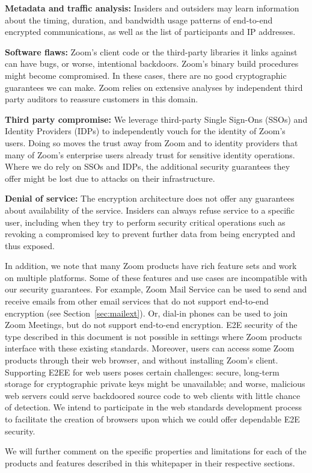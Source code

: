 \begin{description}
	\item {\bf Metadata and traffic analysis:} Insiders and outsiders may learn information about
		the timing, duration, and bandwidth usage patterns of end-to-end encrypted communications,
		as well as the list of participants and IP addresses.
	\item {\bf Software flaws:} Zoom's client code or the third-party libraries it links against can
		have bugs, or worse, intentional backdoors. Zoom's binary build procedures might become
		compromised. In these cases, there are no good cryptographic guarantees we can make. Zoom
		relies on extensive analyses by independent third party auditors to reassure customers in
		this domain.
	\item {\bf Third party compromise:} We leverage third-party Single Sign-Ons (SSOs) and Identity
		Providers (IDPs) to independently vouch for the identity of Zoom's users. Doing so moves
		the trust away from Zoom and to identity providers that many of Zoom's enterprise users
		already trust for sensitive identity operations. Where we do rely on SSOs and IDPs, the
		additional security guarantees they offer might be lost due to attacks on their
		infrastructure.
	\item {\bf Denial of service:} The encryption architecture does not offer any guarantees about
		availability of the service. Insiders can always refuse service to a specific user,
		including when they try to perform security critical operations such as revoking a
		compromised key to prevent further data from being encrypted and thus exposed.
\end{description}

In addition, we note that many Zoom products have rich feature sets and work on multiple platforms.
Some of these features and use cases are incompatible with our security guarantees. For example,
Zoom Mail Service can be used to send and receive emails from other email services that do not
support end-to-end encryption (see Section~\ref{sec:mailext}). Or, dial-in phones can be used to
join Zoom Meetings, but do not support end-to-end encryption. E2E security of the type described in
this document is not possible in settings where Zoom products interface with these existing
standards. Moreover, users can access some Zoom products through their web browser, and without
installing Zoom's client. Supporting E2EE for web users poses certain challenges: secure, long-term
storage for cryptographic private keys might be unavailable; and worse, malicious web servers could
serve backdoored source code to web clients with little chance of detection. We intend to
participate in the web standards development process to facilitate the creation of browsers upon
which we could offer dependable E2E security.

We will further comment on the specific properties and limitations for each of the products and
features described in this whitepaper in their respective sections.
